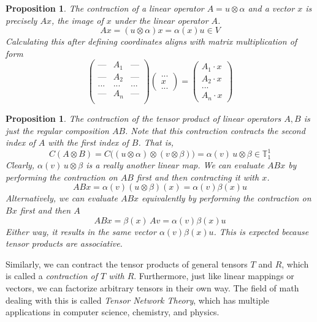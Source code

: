 \documentclass{article}
\newtheorem{proposition}[theorem]{Proposition}
\theoremstyle{remark}
\theoremstyle{definition}
\begin{document}
    \begin{proposition}
    The contraction of a linear operator $A = u \otimes \alpha$ and a vector $x$ is precisely $A x$, the image of $x$ under the linear operator $A$. 
    \[A x = (u \otimes \alpha) x = \alpha (x) u \in V\]
    Calculating this after defining coordinates aligns with matrix multiplication of form
    \[\begin{pmatrix}
    \text{---} & A_1 & \text{---} \\
    \text{---} & A_2 & \text{---} \\
    ... & ... & ... \\
    \text{---} & A_n & \text{---} \\
    \end{pmatrix} \begin{pmatrix}
    ... \\ x \\ ... 
    \end{pmatrix} = \begin{pmatrix}
     A_1 \cdot x \\ A_2 \cdot x \\ ... \\ A_n \cdot x
    \end{pmatrix}\]
    \end{proposition}

    \begin{proposition}
    The contraction of the tensor product of linear operators $A, B$ is just the regular composition $A B$. Note that this contraction contracts the second index of $A$ with the first index of $B$. That is, 
    \[C(A \otimes B) = C\big( (u \otimes \alpha) \otimes (v \otimes \beta) \big) = \alpha(v) \, u \otimes \beta \in \mathbb{T}^1_1\]
    Clearly, $\alpha(v) \, u \otimes \beta$ is a really another linear map. We can evaluate $A B x$ by performing the contraction on $A B$ first and then contracting it with $x$. 
    \[A B x = \alpha (v) (u \otimes \beta) (x) = \alpha (v) \beta(x) u \]
    Alternatively, we can evaluate $A B x$ equivalently by performing the contraction on $B x$ first and then $A$ 
    \[A B x = \beta (x)\, A v = \alpha(v) \beta(x) u\]
    Either way, it results in the same vector $\alpha (v) \beta (x) u$. This is expected because tensor products are associative. 
    \end{proposition}

    Similarly, we can contract the tensor products of general tensors $T$ and $R$, which is called a \textit{contraction of $T$ with $R$}. Furthermore, just like linear mappings or vectors, we can factorize arbitrary tensors in their own way. The field of math dealing with this is called \textit{Tensor Network Theory}, which has multiple applications in computer science, chemistry, and physics. 
\end{document}
